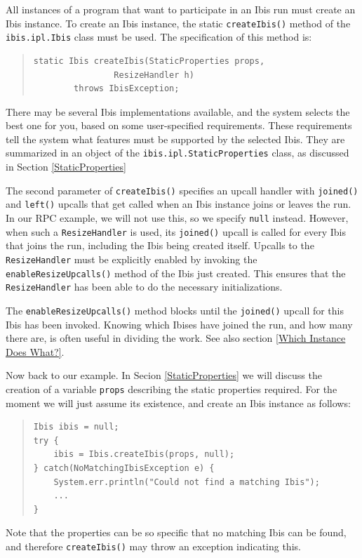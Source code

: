 \documentclass[10pt]{article}
\begin{document}
All instances of a program that want to participate in an Ibis run
must create an Ibis instance.
To create an Ibis instance, the static \texttt{createIbis()} method of the
\texttt{ibis.ipl.Ibis} class must be used.
The specification of this method is:
\begin{quote}
\begin{verbatim}
static Ibis createIbis(StaticProperties props,
                ResizeHandler h)
        throws IbisException;
\end{verbatim}
\end{quote}
There may be several Ibis implementations available, and
the system selects the best one for you, based on some
user-specified requirements.
These requirements tell the system what features must be supported
by the selected Ibis.
They are summarized in an object of the
\texttt{ibis.ipl.StaticProperties} class, as discussed in Section
\ref{StaticProperties}

The second parameter of \texttt{createIbis()} specifies an upcall handler
with \texttt{joined()} and \texttt{left()} upcalls that get called when an Ibis
instance joins or leaves the run.  In our RPC example, we will not use this, so we
specify \texttt{null} instead.  However, when such a \texttt{ResizeHandler}
is used, its \texttt{joined()} upcall is called for every Ibis that joins the
run, including the Ibis being created itself.
Upcalls to the \texttt{ResizeHandler} must be explicitly enabled by
invoking the \texttt{enableResizeUpcalls()} method of the Ibis
just created. This ensures that the \texttt{ResizeHandler} has been
able to do the necessary initializations.

The \texttt{enableResizeUpcalls()} method blocks until the
\texttt{joined()} upcall for this Ibis has been invoked.  Knowing which Ibises
have joined the run, and how many there are, is often useful in dividing
the work. See also section \ref{Which Instance Does What?}.

Now back to our example. In Secion \ref{StaticProperties} we will
discuss the creation of a variable \texttt{props} describing the
static properties required. For the moment we will just assume its
existence, and create an Ibis instance as follows:
\begin{quote}
\begin{verbatim}
Ibis ibis = null;
try {
    ibis = Ibis.createIbis(props, null);
} catch(NoMatchingIbisException e) {
    System.err.println("Could not find a matching Ibis");
    ...
}
\end{verbatim}
\end{quote}
Note that the properties can be so specific that no matching Ibis
can be found, and therefore \texttt{createIbis()} may throw an exception
indicating this.
\end{document}
